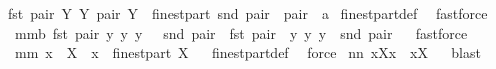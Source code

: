 \begin{isabellebody}
{\isacharbraceleft}{\isacharparenleft}fst\ pair{\isacharcomma}\ Y{\isacharparenright}{\isacharbar}\ Y\ pair{\isachardot}\ Y\ {\isasymin}\ finestpart\ {\isacharparenleft}snd\ pair{\isacharparenright}\ {\isacharampersand}\ pair\ {\isasymin}\ a{\isacharbraceright}{\isachardoublequoteclose}\isanewline
%
\isadelimproof
%
\endisadelimproof
%
\isatagproof
{}\isamarkupfalse%
\ finestpart{\isacharunderscore}def\ \isamarkupfalse%
\ fastforce%
\endisatagproof
{\isafoldproof}%
%
\isadelimproof
\isanewline
%
\endisadelimproof
\isanewline
{}\isamarkupfalse%
\ mm{}{}b{\isacharcolon}\ {\isachardoublequoteopen}{\isacharbraceleft}{\isacharparenleft}fst\ pair{\isacharcomma}\ {\isacharbraceleft}y{\isacharbraceright}{\isacharparenright}{\isacharbar}\ y{\isachardot}\ y\ {\isasymin}\ \ snd\ pair{\isacharbraceright}\ {\isacharequal}\ {\isacharbraceleft}fst\ pair{\isacharbraceright}\ {\isasymtimes}\ {\isacharbraceleft}{\isacharbraceleft}y{\isacharbraceright}{\isacharbar}\ y{\isachardot}\ y\ {\isasymin}\ snd\ pair{\isacharbraceright}{\isachardoublequoteclose}%
\isadelimproof
\ %
\endisadelimproof
%
\isatagproof
{}\isamarkupfalse%
\ fastforce%
\endisatagproof
{\isafoldproof}%
%
\isadelimproof
%
\endisadelimproof
\isanewline
\isanewline
{}\isamarkupfalse%
\ mm{}{}{\isacharcolon}\ {\isachardoublequoteopen}x\ {\isasymin}\ X\ {\isacharequal}\ {\isacharparenleft}{\isacharbraceleft}x{\isacharbraceright}\ {\isasymin}\ finestpart\ X{\isacharparenright}{\isachardoublequoteclose}%
\isadelimproof
\ %
\endisadelimproof
%
\isatagproof
{}\isamarkupfalse%
\ finestpart{\isacharunderscore}def\ \isamarkupfalse%
\ force%
\endisatagproof
{\isafoldproof}%
%
\isadelimproof
%
\endisadelimproof
\isanewline
\isanewline
{}\isamarkupfalse%
\ nn{}{}{\isacharcolon}\ {\isachardoublequoteopen}{\isacharbraceleft}{\isacharparenleft}x{\isacharcomma}X{\isacharparenright}{\isacharbraceright}{\isacharminus}{\isacharbraceleft}{\isacharparenleft}x{\isacharcomma}{\isacharbraceleft}{\isacharbraceright}{\isacharparenright}{\isacharbraceright}\ {\isacharequal}\ {\isacharbraceleft}x{\isacharbraceright}{\isasymtimes}{\isacharparenleft}{\isacharbraceleft}X{\isacharbraceright}{\isacharminus}{\isacharbraceleft}{\isacharbraceleft}{\isacharbraceright}{\isacharbraceright}{\isacharparenright}{\isachardoublequoteclose}%
\isadelimproof
\ %
\endisadelimproof
%
\isatagproof
{}\isamarkupfalse%
\ blast%
\endisatagproof
{\isafoldproof}%

\end{isabellebody}
